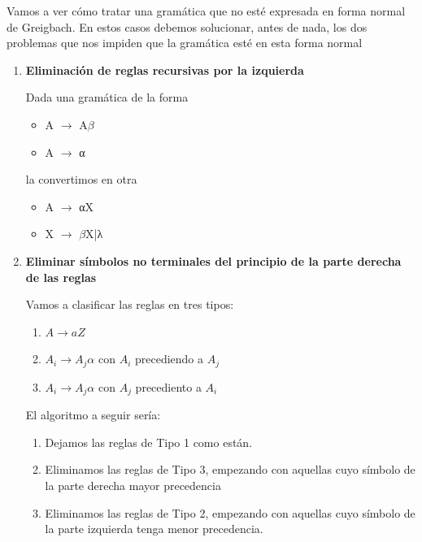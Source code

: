 \documentclass{apuntes}
\begin{document}
Vamos a ver cómo tratar una gramática que no esté expresada en forma normal de Greigbach. En estos casos debemos solucionar, antes de nada, los dos problemas que nos impiden que la gramática esté en esta forma normal

\begin{enumerate}
\item \textbf{Eliminación de reglas recursivas por la izquierda}

Dada una gramática de la forma
\begin{itemize}
\item A $\rightarrow$ A$\beta$
\item A $\rightarrow$ α
\end{itemize}
la convertimos en otra
\begin{itemize}
\item A $\rightarrow$ αX
\item X $\rightarrow$ $\beta$X|λ
\end{itemize}

\item \textbf{Eliminar símbolos no terminales del principio de la parte derecha de las reglas}

Vamos a clasificar las reglas en tres tipos:
\begin{enumerate}
\item $A \rightarrow aZ$
\item $A_i \rightarrow A_jα$ con $A_i$ precediendo a $A_j$
\item $A_i \rightarrow A_jα$ con $A_j$ precediento a $A_i$
\end{enumerate}

El algoritmo a seguir sería:
\begin{enumerate}
\item Dejamos las reglas de Tipo 1 como están.
\item Eliminamos las reglas de Tipo 3, empezando con aquellas cuyo símbolo de la parte derecha mayor precedencia
\item Eliminamos las reglas de Tipo 2, empezando con aquellas cuyo símbolo de la parte izquierda tenga menor precedencia.
\end{enumerate}
\end{enumerate}
\end{document}

